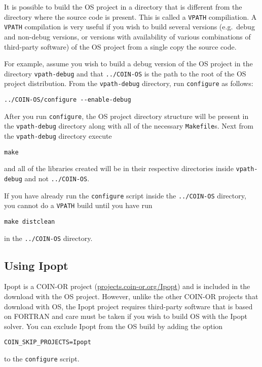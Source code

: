 \documentclass[11pt]{article}
\renewcommand{\_}{{\char"5F}}
\renewcommand{\{}{{\char"7B}}
\renewcommand{\}}{{\char"7D}}
\renewcommand{\^}{{\char"0D}}
\renewcommand{\'}{{\char"0D}}
\begin{document}
It is possible to build the OS project in a directory that is different from
the directory where the source code is present. This is called a {\tt VPATH}
compiliation.  A {\tt VPATH}  compilation  is very useful if you wish to
build several versions (e.g.\ debug and non-debug versions, or versions with
availability of various combinations of third-party software) of the OS
project from a single copy the source code.

For  example, assume you wish to build a debug version of the OS project in
the directory {\tt vpath-debug} and that {\tt ../COIN-OS} is the path to the
root of the OS project distribution.  From the {\tt vpath-debug} directory,
run {\tt configure} as follows:

\begin{verbatim}
../COIN-OS/configure --enable-debug
\end{verbatim}
%
After you run {\tt configure}, the OS project directory structure will be
present in the {\tt vpath-debug} directory along with all of the necessary
{\tt Makefile}s.  Next from the {\tt vpath-debug} directory execute

\begin{verbatim}
make
\end{verbatim}
%
and all of  the libraries created will be in their respective directories
inside {\tt vpath-debug} and not {\tt ../COIN-OS}.

\vskip 8pt
 If you have already run the {\tt configure} script
inside the {\tt ../COIN-OS} directory, you cannot do a {\tt VPATH} build
until you have run
%
\begin{verbatim}
make distclean
\end{verbatim}
%
in the {\tt ../COIN-OS} directory.


\subsection{Using Ipopt}\label{section:ipopt}


Ipopt is a COIN-OR project (\url{projects.coin-or.org/Ipopt}) and is included in the download with the OS project. However, unlike the other COIN-OR projects that download with OS, the Ipopt project requires third-party software that is based on FORTRAN and care must be taken if you wish to build OS with the  Ipopt solver.  You can  exclude Ipopt from the OS  build by adding the option

\begin{verbatim}
COIN_SKIP_PROJECTS=Ipopt
\end{verbatim}
to the {\tt configure} script.
\end{document}
